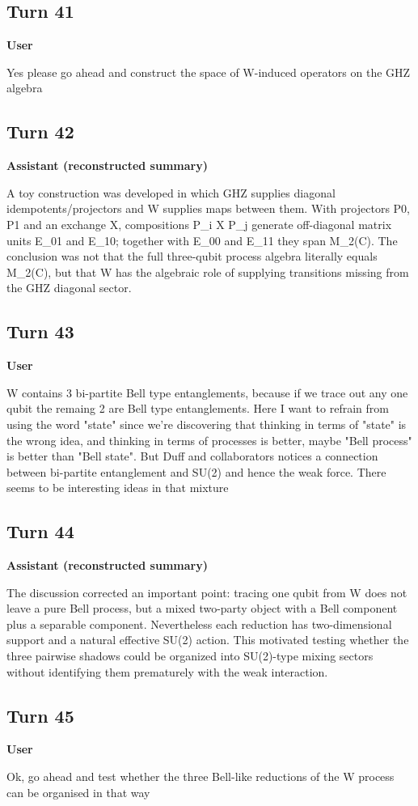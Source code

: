 \documentclass[11pt,a4paper]{article}
\newcommand{\speaker}[1]{\par\medskip\noindent\textbf{\large #1}\par\smallskip}
\begin{document}
\subsection*{Turn 41}
\speaker{User}
Yes please go ahead and construct the space of W-induced operators on the GHZ algebra
\subsection*{Turn 42}
\speaker{Assistant (reconstructed summary)}
A toy construction was developed in which GHZ supplies diagonal idempotents/projectors and W supplies maps between them. With projectors P0, P1 and an exchange X, compositions P\_i X P\_j generate off-diagonal matrix units E\_01 and E\_10; together with E\_00 and E\_11 they span M\_2(C). The conclusion was not that the full three-qubit process algebra literally equals M\_2(C), but that W has the algebraic role of supplying transitions missing from the GHZ diagonal sector.
\subsection*{Turn 43}
\speaker{User}
W contains 3 bi-partite Bell type entanglements, because if we trace out any one qubit the remaing 2 are Bell type entanglements. Here I want to refrain from using the word "state" since we're discovering that thinking in terms of "state" is the wrong idea, and thinking in terms of processes is better, maybe "Bell process" is better than "Bell state". But Duff and collaborators notices a connection between bi-partite entanglement and SU(2) and hence the weak force. There seems to be interesting ideas in that mixture
\subsection*{Turn 44}
\speaker{Assistant (reconstructed summary)}
The discussion corrected an important point: tracing one qubit from W does not leave a pure Bell process, but a mixed two-party object with a Bell component plus a separable component. Nevertheless each reduction has two-dimensional support and a natural effective SU(2) action. This motivated testing whether the three pairwise shadows could be organized into SU(2)-type mixing sectors without identifying them prematurely with the weak interaction.
\subsection*{Turn 45}
\speaker{User}
Ok, go ahead and test whether the three Bell-like reductions of the W process can be organised in that way
\end{document}
